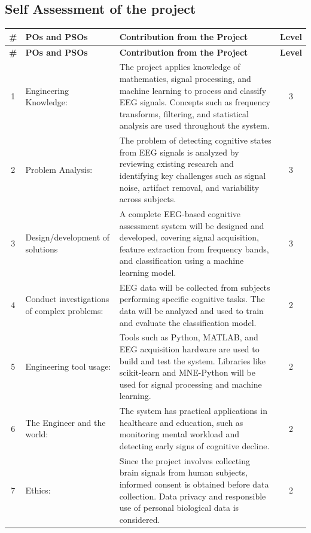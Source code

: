 \begin{appendices}
\chapter{Self Assessment of the project}
\begin{longtable}{|c|p{4cm}|p{7.5cm}|c|}
\hline
\textbf{\#} & \textbf{POs and PSOs} & \textbf{Contribution from the Project} & \textbf{Level} \\
\hline
\endfirsthead

\hline
\textbf{\#} & \textbf{POs and PSOs} & \textbf{Contribution from the Project} & \textbf{Level} \\
\hline
\endhead

\hline
\endfoot

1 & Engineering Knowledge: & The project applies knowledge of mathematics, signal processing, and machine learning to process and classify EEG signals. Concepts such as frequency transforms, filtering, and statistical analysis are used throughout the system. & 3 \\
\hline
2 & Problem Analysis: & The problem of detecting cognitive states from EEG signals is analyzed by reviewing existing research and identifying key challenges such as signal noise, artifact removal, and variability across subjects. & 3 \\
\hline
3 & Design/development of solutions & A complete EEG-based cognitive assessment system will be designed and developed, covering signal acquisition, feature extraction from frequency bands, and classification using a machine learning model. & 3 \\
\hline
4 & Conduct investigations of complex problems: & EEG data will be collected from subjects performing specific cognitive tasks. The data will be analyzed and used to train and evaluate the classification model. & 2 \\
\hline
5 & Engineering tool usage: & Tools such as Python, MATLAB, and EEG acquisition hardware are used to build and test the system. Libraries like scikit-learn and MNE-Python will be used for signal processing and machine learning. & 2 \\
\hline
6 & The Engineer and the world: & The system has practical applications in healthcare and education, such as monitoring mental workload and detecting early signs of cognitive decline. & 2 \\
\hline
7 & Ethics: & Since the project involves collecting brain signals from human subjects, informed consent is obtained before data collection. Data privacy and responsible use of personal biological data is considered. & 2 \\

\end{longtable}
\end{appendices}
